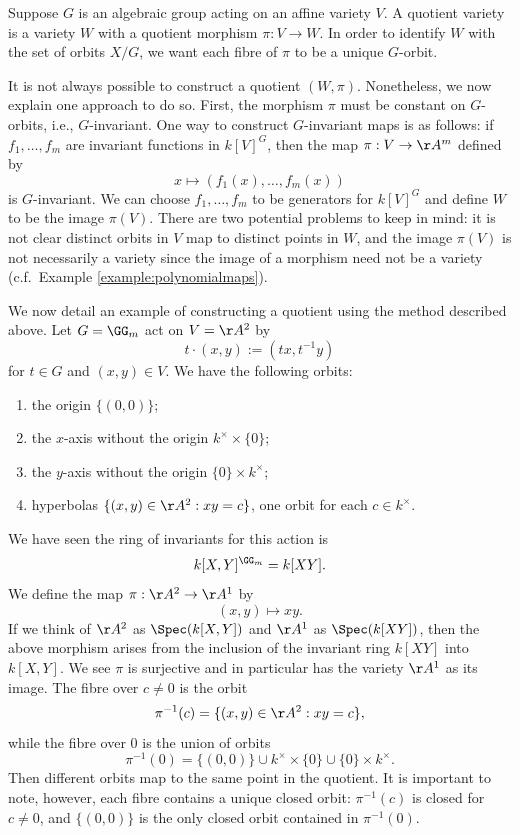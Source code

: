 \documentclass[12pt]{amsart}
\theoremstyle{plain}
\theoremstyle{definition}
\begin{document}
Suppose $G$ is an algebraic group acting on an affine variety $V$.
A quotient variety is a variety $W$ with a quotient morphism $\pi : V \to W$.
In order to identify $W$ with the set of orbits $X / G$, we want each fibre of $\pi$ to be a unique $G$-orbit.

It is not always possible to construct a quotient $(W, \pi)$.
Nonetheless, we now explain one approach to do so.
First, the morphism $\pi$ must be constant on $G$-orbits, i.e., $G$-invariant.
One way to construct $G$-invariant maps is as follows:
if $f_1, \ldots, f_m$ are invariant functions in $k[V]^G$, then the map $\pi : V \to \AA^m$ defined by
$$x \mapsto (f_1(x), \ldots, f_m(x))$$
is $G$-invariant.
We can choose $f_1, \ldots, f_m$ to be generators for $k[V]^G$ and define $W$ to be the image $\pi(V)$.
There are two potential problems to keep in mind: it is not clear distinct orbits in $V$ map to distinct points in $W$, and the image $\pi(V)$ is not necessarily a variety since the image of a morphism need not be a variety (c.f.\ Example \ref{example:polynomialmaps}).

We now detail an example of constructing a quotient using the method described above.
Let $G = \GG_m $ act on $V = \AA^2$ by
$$t \cdot (x, y) := (tx, t^{-1}y)$$
for $t \in G$ and $(x, y) \in V$.
We have the following orbits:
\begin{enumerate}
\item the origin $\{(0, 0)\}$;
\item the $x$-axis without the origin $k^\times \times \{0\}$;
\item the $y$-axis without the origin $\{0\} \times k^\times$;
\item hyperbolas $\{(x, y) \in \AA^2 : xy = c\}$, one orbit for each $c \in k^\times$. 
\end{enumerate}	
We have seen the ring of invariants for this action is
$$k[X,Y]^{\GG_m} = k[XY].$$
We define the map $\pi : \AA^2 \to \AA^1$ by
$$(x, y) \mapsto xy.$$
If we think of $\AA^2$ as $\Spec(k[X, Y])$ and $\AA^1$ as $\Spec(k[XY])$, then the above morphism arises from the inclusion of the invariant ring $k[XY]$ into $k[X, Y]$.
We see $\pi$ is surjective and in particular has the variety $\AA^1$ as its image.
The fibre over $c \ne 0$ is the orbit
$$\pi^{-1}(c) = \{(x, y) \in \AA^2 : xy = c\},$$
while the fibre over $0$ is the union of orbits
$$\pi^{-1}(0) = \{(0, 0)\} \cup k^\times \times \{0\} \cup \{0\} \times k^\times.$$
Then different orbits map to the same point in the quotient.
It is important to note, however, each fibre contains a unique closed orbit: $\pi^{-1}(c)$ is closed for $c \ne 0$, and $\{(0, 0)\}$ is the only closed orbit contained in $\pi^{-1}(0)$.
\end{document}
